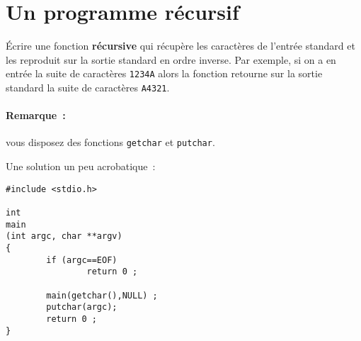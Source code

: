 \section{Un programme r\'ecursif}
 \'Ecrire une fonction \textbf{r\'ecursive} qui r\'ecup\`ere  les caract\`eres de 
l'entr\'ee standard et les reproduit sur la sortie standard en ordre inverse.
Par exemple, si on a en entr\'ee la suite de caract\`eres \verb+1234A+ alors
la fonction retourne sur la sortie standard la suite de caract\`eres
\verb+A4321+.
\paragraph{Remarque~:} vous disposez des fonctions \verb+getchar+ et \verb+putchar+.
\ifcorrection
\par
Une solution un peu acrobatique~:
\begin{verbatim}
#include <stdio.h>

int
main
(int argc, char **argv)
{
        if (argc==EOF)
                return 0 ;

        main(getchar(),NULL) ;
        putchar(argc);
        return 0 ;
}
\end{verbatim}
\fi
